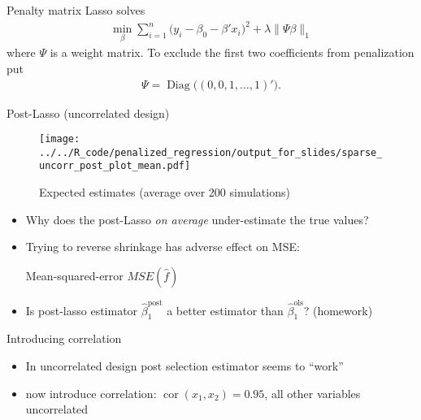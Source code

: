\documentclass[xcolor=dvipsnames]{beamer}
\DeclareMathOperator{\diag}{Diag}
\DeclareMathOperator{\cor}{cor}
\begin{document}
\begin{frame}{Penalty matrix}
Lasso solves 
  \begin{align*}
    \min_{\beta} \sum_{i=1}^n \big(y_i - \beta_0 - \beta' x_i \big)^2 + \lambda \lVert \Psi \beta \rVert_1  
  \end{align*}
where $\Psi$ is a weight matrix. To exclude the first two coefficients from penalization put
\begin{align*}
  \Psi = \diag\big((0, 0, 1, \dotsc, 1)'\big).
\end{align*}
\end{frame}

\begin{frame}{Post-Lasso (uncorrelated design)}
\begin{figure}
  \texttt{[image: ../../R\_code/penalized\_regression/output\_for\_slides/sparse\_uncorr\_post\_plot\_mean.pdf]}
   \caption{Expected estimates (average over 200 simulations)}
\end{figure}
\end{frame}

\begin{frame}{}
  
  \begin{itemize}
    \item 
    Why does the post-Lasso \emph{on average} under-estimate the true values?
    \item Trying to reverse shrinkage has adverse effect on MSE:  
    \begin{table}
    
      \caption{Mean-squared-error $MSE(\hat{f})$}
    \end{table}
    \item 
    Is post-lasso estimator $\hat{\beta}_1^{\text{post}}$ a better estimator than $\hat{\beta}_1^{\text{ols}}$? (homework)
  \end{itemize}
\end{frame}

\begin{frame}{Introducing correlation}
    \begin{itemize}
      \item In uncorrelated design post selection estimator seems to ``work''
      \item now introduce correlation: $\cor(x_1, x_2) = 0.95$, all other variables uncorrelated
    \end{itemize}
\end{frame}
\end{document}
